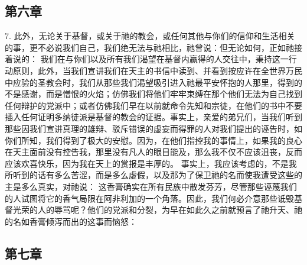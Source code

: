 
\subsection{第六章}

7. 此外，无论关于基督，或关于祂的教会，或任何其他与你们的信仰和生活相关的事，更不必说我们自己，我们绝无法与祂相比，祂曾说：但无论如何，正如祂接着说的： 我们在与你们以及所有我们渴望在基督内赢得的人交往中，秉持这一行动原则，此外，当我们宣讲我们在天主的书信中读到、并看到按应许在全世界万民中应验的圣教会时，我们从那些我们渴望吸引进入祂最平安怀抱的人那里，得到的不是感谢，而是憎恨的火焰；仿佛我们将他们牢牢束缚在那个他们无法为自己找到任何辩护的党派中；或者仿佛我们早在以前就命令先知和宗徒，在他们的书中不要插入任何证明多纳徒派是基督的教会的证据。事实上，亲爱的弟兄们，当我们听到那些因我们宣讲真理的雄辩、驳斥错误的虚妄而得罪的人对我们提出的诬告时，如你们所知，我们得到了极大的安慰。因为，在他们指控我的事情上，如果我的良心在天主面前没有控告我，那里没有凡人的眼目能及，那么我不仅不应该沮丧，反而应该欢喜快乐，因为我在天上的赏报是丰厚的。 事实上，我应该考虑的，不是我所听到的话有多么苦涩，而是多么虚假，以及那为了保卫祂的名而使我遭受这些的主是多么真实，对祂说： 这香膏确实在所有民族中散发芬芳，尽管那些诬蔑我们的人试图将它的香气局限在阿非利加的一个角落。因此，我们何必介意那些诋毁基督光荣的人的辱骂呢？他们的党派和分裂，为早在如此久之前就预言了祂升天、祂的名如香膏倾泻而出的这事而恼怒：\par


\subsection{第七章}

